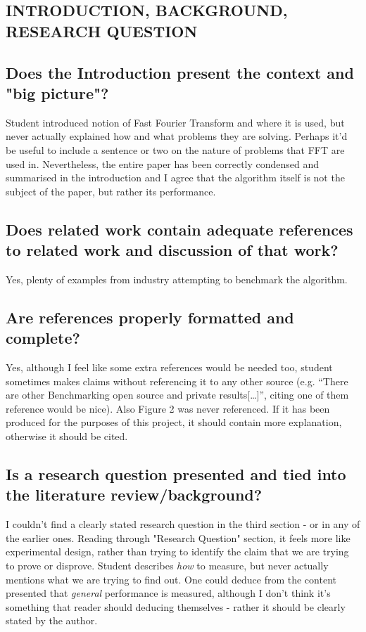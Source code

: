 \documentclass{article}
\begin{document}
    \begin{normalsize}
    
    	\section{INTRODUCTION, BACKGROUND, RESEARCH QUESTION}
       \subsection{Does the Introduction present the context and "big picture"?} 
Student introduced notion of Fast Fourier Transform and where it is used, but never actually explained how and what problems they are solving. Perhaps it'd be useful to include a sentence or two on the nature of problems that FFT are used in. Nevertheless, the entire paper has been correctly condensed and summarised in the introduction and I agree that the algorithm itself is not the subject of the paper, but rather its performance.
      
		\subsection{Does related work contain adequate references to related work and discussion of that work?  }
Yes, plenty of examples from industry attempting to benchmark the algorithm.
\subsection{Are references properly formatted and complete?}
Yes, although I feel like some extra references would be needed too, student sometimes makes claims without referencing it to any other source (e.g. ``There are other Benchmarking open source and private results[\ldots]'', citing one of them reference would be nice).
\bigbreak\noindent
Also Figure 2 was never referenced. If it has been produced for the purposes of this project, it should contain more explanation, otherwise it should be cited. 
\subsection{Is a research question presented and tied into the literature review/background?}
I couldn't find a clearly stated research question in the third section - or in any of the earlier ones. Reading through "Research Question" section, it feels more like experimental design, rather than trying to identify the claim that we are trying to prove or disprove. Student describes \textit{how} to measure, but never actually mentions what we are trying to find out. One could deduce from the content presented that \textit{general} performance is measured, although I don't think it's something that reader should deducing themselves - rather it should be clearly stated by the author.

\end{normalsize}
\end{document}
